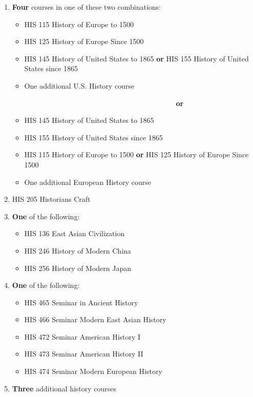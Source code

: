 \documentclass[
  letterpaper,
]{scrbook}
\providecommand{\tightlist}{%
  \setlength{\itemsep}{0pt}\setlength{\parskip}{0pt}}
\begin{document}
\begin{enumerate}
\def\labelenumi{\arabic{enumi}.}
\item
  \textbf{Four} courses in one of these two combinations:

  \begin{itemize}
  \tightlist
  \item
    HIS 115 History of Europe to 1500
  \item
    HIS 125 History of Europe Since 1500
  \item
    HIS 145 History of United States to 1865 \textbf{or} HIS 155 History
    of United States since 1865
  \item
    One additional U.S. History course
  \end{itemize}

  ~~~~~~~~~~~~~~~~~~~~~~~~~~~~~~~~~~~~~~~~~~~~~ \textbf{or}

  \begin{itemize}
  \tightlist
  \item
    HIS 145 History of United States to 1865
  \item
    HIS 155 History of United States since 1865
  \item
    HIS 115 History of Europe to 1500 \textbf{or} HIS 125 History of
    Europe Since 1500
  \item
    One additional European History course
  \end{itemize}
\item
  HIS 205 Historians Craft
\item
  \textbf{One} of the following:

  \begin{itemize}
  \tightlist
  \item
    HIS 136 East Asian Civilization
  \item
    HIS 246 History of Modern China
  \item
    HIS 256 History of Modern Japan
  \end{itemize}
\item
  \textbf{One} of the following:

  \begin{itemize}
  \tightlist
  \item
    HIS 465 Seminar in Ancient History
  \item
    HIS 466 Seminar Modern East Asian History
  \item
    HIS 472 Seminar American History I
  \item
    HIS 473 Seminar American History II
  \item
    HIS 474 Seminar Modern European History
  \end{itemize}
\item
  \textbf{Three} additional history courses
\end{enumerate}
\end{document}
